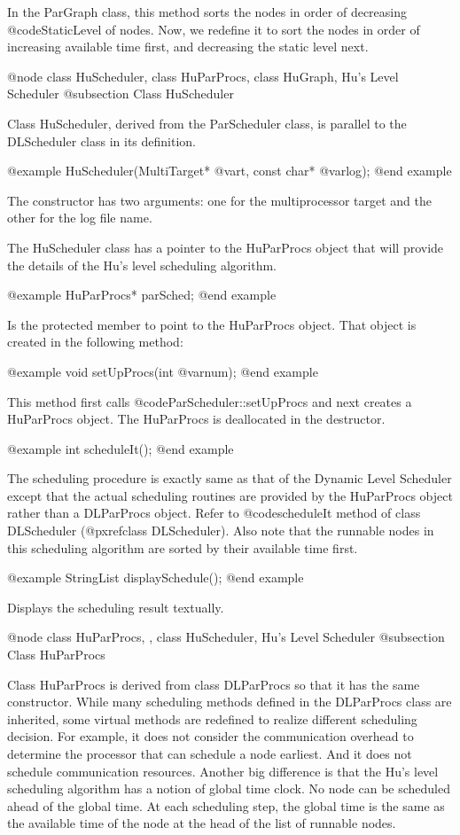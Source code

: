 In the ParGraph class, this method sorts the nodes in order of decreasing
@code{StaticLevel} of nodes. Now, we redefine it to sort the nodes in order
of increasing available time first, and decreasing the static level next.

@node class HuScheduler, class HuParProcs, class HuGraph, Hu's Level Scheduler
@subsection Class HuScheduler

Class HuScheduler, derived from the ParScheduler class, is parallel to the
DLScheduler class in its definition.

@example
HuScheduler(MultiTarget* @var{t}, const char* @var{log});
@end example

The constructor has two arguments: one for the multiprocessor target and the
other for the log file name.

The HuScheduler class has a pointer to the HuParProcs object that will
provide the details of the Hu's level scheduling algorithm.

@example
HuParProcs* parSched;
@end example

Is the protected member to point to the HuParProcs object.
That object is created in the following method:

@example
void setUpProcs(int @var{num});
@end example

This method first calls @code{ParScheduler::setUpProcs} and next creates
a HuParProcs object. The HuParProcs is deallocated in the destructor.

@example
int scheduleIt();
@end example

The scheduling procedure is exactly same as that of the Dynamic Level 
Scheduler except that the actual scheduling routines are provided
by the HuParProcs object rather than a DLParProcs object. 
Refer to @code{scheduleIt} method of class DLScheduler
(@pxref{class DLScheduler}). Also note that the runnable nodes in
this scheduling algorithm are sorted by their available time first.

@example
StringList displaySchedule();
@end example

Displays the scheduling result textually.

@node class HuParProcs, , class HuScheduler, Hu's Level Scheduler
@subsection Class HuParProcs

Class HuParProcs is derived from class DLParProcs so that it has the
same constructor. While many scheduling methods defined in the
DLParProcs class are inherited, some virtual methods are redefined to
realize different scheduling decision. For example, it does not
consider the communication overhead to determine the processor that can
schedule a node earliest. And it does not schedule communication resources.
Another big difference is that the Hu's level scheduling algorithm has
a notion of global time clock. No node can be scheduled ahead of the global
time. At each scheduling step, the global time is the same as the
available time of the node at the head of the list of runnable nodes.

